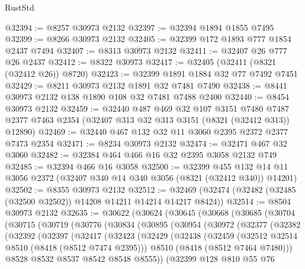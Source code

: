 \begin{lexlean}{RustStd}
\begin{coremodule}
@32394 := @8257 @30973 @2132
@32397 := @32394 @1894 @1855 @7495
@32399 := @8266 @30973 @2132
@32405 := @32399 @172 @1893 @777 @1854 @2437 @7494
@32407 := @8313 @30973 @2132
@32411 := @32407 @26 @777 @26 @2437
@32412 := @8322 @30973
@32417 := @32405 (@32411 (@8321 (@32412 @26)) @8720)
@32423 := @32399 @1891 @1884 @32 @77 @7492 @7451
@32429 := @8211 @30973 @2132 @1891 @32 @7481 @7490
@32438 := @8441 @30973 @2132 @138 @1890 @108 @32 @7481 @7488 @2400
@32440 := @8454 @30973 @2132
@32459 := @32440
    @487
    @469
    @32
    @107
    @3151
    @7480
    @7487
    @2377
    @7463
    @2354
    (@32407 @313 @32 @313 @3151 (@8321 (@32412 @313)) @12890)
@32469 := @32440 @467 @132 @32 @11 @3060 @2395 @2372 @2377 @7473 @2354
@32471 := @8234 @30973 @2132
@32474 := @32471 @467 @32 @3060
@32482 := @32384 @464 @466 @16 @32 @2395 @3058 @2132 @749
@32485 := @32394 @466 @16 @3058
@32500 := @32399
    @455
    @132
    @14
    @11
    @3056
    @2372
    (@32407 @340 @14 @340 @3056 (@8321 (@32412 @340)) @14201)
@32502 := @8355 @30973 @2132
@32512 := @32469 (@32474 (@32482 (@32485 (@32500 @32502)) @14208 @14211 @14214 @14217 @8424))
@32514 := @8504 @30973 @2132
@32635 := @30622
    (@30624
      (@30645
        (@30668
          (@30685
            (@30704
              (@30715
                (@30719
                  (@30776
                    (@30834
                      (@30895
                        (@30954
                          (@30972
                            (@32377
                              (@32382
                                (@32392
                                  (@32397
                                    (@32417
                                      (@32423
                                        (@32429
                                          (@32438
                                            (@32459
                                              (@32512 @32514 @8510 (@8418 (@8512 @7474 @2395)))
                                              @8510
                                              (@8418 (@8512 @7464 @7480)))
                                            @8528
                                            @8532
                                            @8537
                                            @8542
                                            @8548
                                            @8555))
                                        (@32399
                                          @128
                                          @810
                                          @55
                                          @76

\end{coremodule}
\end{lexlean}

